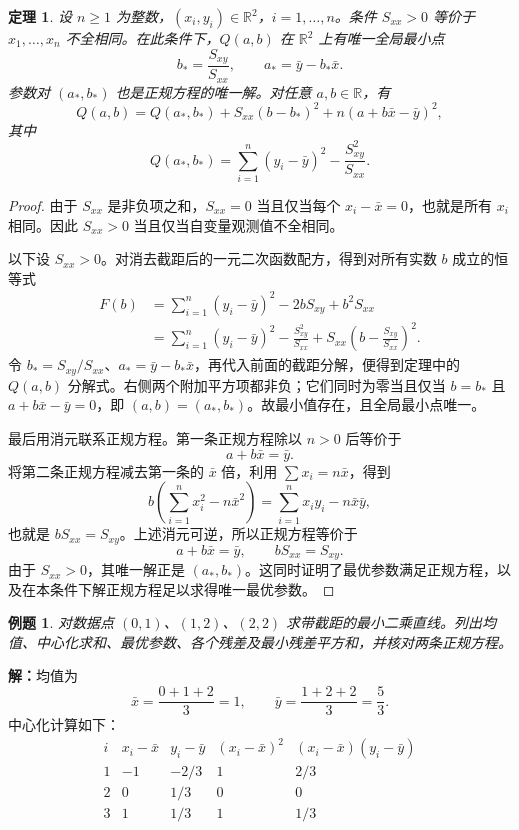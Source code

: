 \documentclass[UTF8,fontset=fandol,11pt]{ctexart}
\newtheorem{theorem}[definition]{定理}
\newtheorem{example}[definition]{例题}
\begin{document}
\begin{theorem}
设 $n\geq1$ 为整数，$(x_i,y_i)\in\mathbb{R}^2$，$i=1,\ldots,n$。条件 $S_{xx}>0$ 等价于 $x_1,\ldots,x_n$ 不全相同。在此条件下，$Q(a,b)$ 在 $\mathbb{R}^2$ 上有唯一全局最小点
\[
b_* =\frac{S_{xy}}{S_{xx}},\qquad a_* =\bar{y}-b_*\bar{x}.
\]
参数对 $(a_*,b_*)$ 也是正规方程的唯一解。对任意 $a,b\in\mathbb{R}$，有
\[
Q(a,b)=Q(a_*,b_*)+S_{xx}(b-b_*)^2+n(a+b\bar{x}-\bar{y})^2,
\]
其中
\[
Q(a_*,b_*)=\sum_{i=1}^{n}(y_i-\bar{y})^2-\frac{S_{xy}^2}{S_{xx}}.
\]
\end{theorem}
\begin{proof}
由于 $S_{xx}$ 是非负项之和，$S_{xx}=0$ 当且仅当每个 $x_i-\bar{x}=0$，也就是所有 $x_i$ 相同。因此 $S_{xx}>0$ 当且仅当自变量观测值不全相同。

以下设 $S_{xx}>0$。对消去截距后的一元二次函数配方，得到对所有实数 $b$ 成立的恒等式
\[
\begin{aligned}
F(b)
&=\sum_{i=1}^{n}(y_i-\bar{y})^2-2bS_{xy}+b^2S_{xx}\\
&=\sum_{i=1}^{n}(y_i-\bar{y})^2-\frac{S_{xy}^2}{S_{xx}}
  +S_{xx}\left(b-\frac{S_{xy}}{S_{xx}}\right)^2.
\end{aligned}
\]
令 $b_*=S_{xy}/S_{xx}$、$a_*=\bar{y}-b_*\bar{x}$，再代入前面的截距分解，便得到定理中的 $Q(a,b)$ 分解式。右侧两个附加平方项都非负；它们同时为零当且仅当 $b=b_*$ 且 $a+b\bar{x}-\bar{y}=0$，即 $(a,b)=(a_*,b_*)$。故最小值存在，且全局最小点唯一。

最后用消元联系正规方程。第一条正规方程除以 $n>0$ 后等价于
\[
a+b\bar{x}=\bar{y}.
\]
将第二条正规方程减去第一条的 $\bar{x}$ 倍，利用 $\sum x_i=n\bar{x}$，得到
\[
b\left(\sum_{i=1}^{n}x_i^2-n\bar{x}^2\right)
=\sum_{i=1}^{n}x_i y_i-n\bar{x}\bar{y},
\]
也就是 $bS_{xx}=S_{xy}$。上述消元可逆，所以正规方程等价于
\[
a+b\bar{x}=\bar{y},\qquad bS_{xx}=S_{xy}.
\]
由于 $S_{xx}>0$，其唯一解正是 $(a_*,b_*)$。这同时证明了最优参数满足正规方程，以及在本条件下解正规方程足以求得唯一最优参数。
\end{proof}
\begin{example}
对数据点 $(0,1)$、$(1,2)$、$(2,2)$ 求带截距的最小二乘直线。列出均值、中心化求和、最优参数、各个残差及最小残差平方和，并核对两条正规方程。
\end{example}
\par\noindent\textbf{解：}均值为
\[
\bar{x}=\frac{0+1+2}{3}=1,\qquad
\bar{y}=\frac{1+2+2}{3}=\frac53.
\]
中心化计算如下：
\[
\begin{array}{c|r|r|r|r}
i&x_i-\bar{x}&y_i-\bar{y}&(x_i-\bar{x})^2&(x_i-\bar{x})(y_i-\bar{y})\\ \hline
1&-1&-2/3&1&2/3\\
2&0&1/3&0&0\\
3&1&1/3&1&1/3
\end{array}
\]
\end{document}
